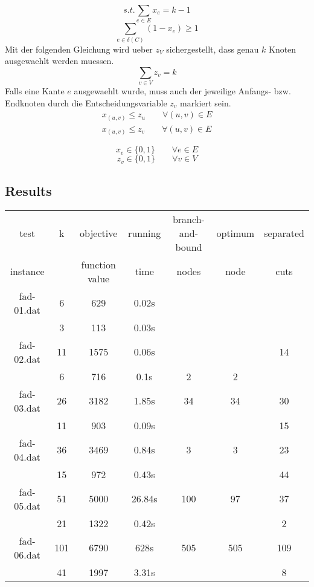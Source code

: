 \documentclass[a4paper,10pt]{article}
\begin{document}
\begin{equation}
 s.t. \sum_{e \in E} x_e = k - 1
\end{equation}
\begin{equation}
 \sum_{e \in \delta(C)} (1 - x_e) \geq 1
\end{equation}
Mit der folgenden Gleichung wird ueber $z_V$ sichergestellt, dass 
genau $k$ Knoten ausgewaehlt werden muessen.
\begin{equation}
 \sum_{v \in V} z_v = k
\end{equation}
Falls eine Kante $e$ ausgewaehlt wurde, muss auch der jeweilige Anfangs- bzw. Endknoten
durch die Entscheidungsvariable $z_v$ markiert sein.
\begin{eqnarray}
 x_{(u,v)} \leq z_u \qquad \forall (u,v) \in E \nonumber \\
 x_{(u,v)} \leq z_v \qquad \forall (u,v) \in E
\end{eqnarray}

\begin{equation}
 x_e \in \{0,1\} \qquad \forall e \in E
\end{equation}
\begin{equation}
 z_v \in \{0,1\} \qquad \forall v \in V
\end{equation}

\subsection*{Results}

\begin{tabular}{ccccccc}
\hline
test & k & objective & running  & branch-and-bound & optimum & separated   \\
instance & & function value & time & nodes & node & cuts \\
\hline
fad-01.dat & 6 & 629 & 0.02s & & &  \\
 & 3 & 113 & 0.03s &  & &  \\
fad-02.dat & 11 & 1575 & 0.06s &  & & 14  \\
 & 6 & 716 & 0.1s & 2 & 2 &  \\
fad-03.dat & 26 & 3182 & 1.85s & 34 & 34 & 30 \\
 & 11 & 903 & 0.09s & & & 15 \\
fad-04.dat & 36 & 3469 & 0.84s & 3 & 3 & 23 \\
 & 15 & 972 & 0.43s & & & 44 \\
fad-05.dat & 51 & 5000 & 26.84s & 100 & 97 & 37 \\
 & 21 & 1322 & 0.42s &  & & 2 \\
fad-06.dat & 101 & 6790 & 628s & 505 & 505 & 109 \\
 & 41 & 1997 & 3.31s & & & 8 \\
\hline
\end{tabular}
\end{document}
